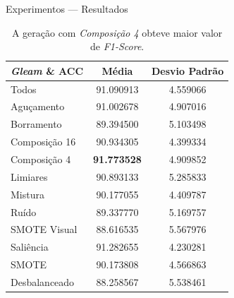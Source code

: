 \documentclass[10pt]{beamer}
\begin{document}
\begin{frame}{Experimentos --- Resultados}
  \setlength\leftmargini{1em}
  \begin{table}
    \begin{center}
      \caption{A geração com \textit{Composição 4} obteve maior valor de \textit{F1-Score}.}
      \footnotesize{
        \begin{tabular}{|l|c|c|}
          \hline
          \textbf{\emph{Gleam} \& ACC} & \textbf{Média}     & \textbf{Desvio Padrão} \\ \hline
          Todos                 & 91.090913          & 4.559066               \\ \hline
          Aguçamento            & 91.002678          & 4.907016               \\ \hline
          Borramento            & 89.394500          & 5.103498               \\ \hline
          Composição 16         & 90.934305          & 4.399334               \\ \hline
          Composição 4          & \textbf{91.773528} & 4.909852               \\ \hline
          Limiares              & 90.893133          & 5.285833               \\ \hline
          Mistura               & 90.177055          & 4.409787               \\ \hline
          Ruído                 & 89.337770          & 5.169757               \\ \hline
          SMOTE Visual          & 88.616535          & 5.567976               \\ \hline
          Saliência             & 91.282655          & 4.230281               \\ \hline
          SMOTE                 & 90.173808          & 4.566863               \\ \hline
          Desbalanceado         & 88.258567          & 5.538461               \\ \hline
        \end{tabular}
      }
    \end{center}
  \end{table}
\end{frame}
\begin{frame}{Experimentos --- Resultados}
  \setlength\leftmargini{1em}
  \begin{figure}
    \begin{center}
      }
    \end{center}
    \caption{\emph{Composição} de quatro imagens da classe \textit{Elephant}.}
  \end{figure}
\end{frame}
\end{document}
